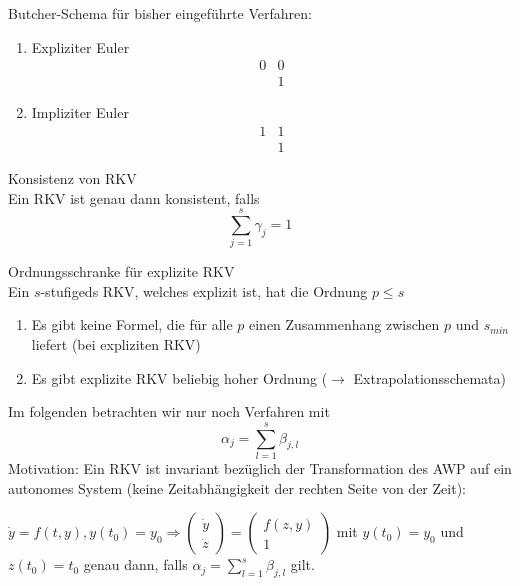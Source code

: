 \begin{example}
	Butcher-Schema für bisher eingeführte Verfahren:
	
	\begin{enumerate}
		\item Expliziter Euler
				$$\begin{array}{cc}
			0 & 0\\
			  & 1
		\end{array}$$

		\item Impliziter Euler
				$$\begin{array}{cc}
			1 & 1\\
			  & 1
		\end{array}$$
		
	\end{enumerate}
\end{example}

\begin{theorem}
	Konsistenz von RKV
	\\
	Ein RKV ist genau dann konsistent, falls
	$$\sum_{j=1}^{s}\gamma_{j}=1$$
\end{theorem}

\begin{theorem}
	Ordnungsschranke für explizite RKV
	\\
	Ein $s$-stufigeds RKV, welches explizit ist, hat die Ordnung $p\le s$
\end{theorem}

\begin{remark}
	\begin{enumerate}
		\item Es gibt keine Formel, die für alle $p$ einen Zusammenhang zwischen $p$ und $s_{min}$ liefert (bei expliziten RKV)
		\item Es gibt explizite RKV beliebig hoher Ordnung ($\rightarrow$ Extrapolationsschemata)
	\end{enumerate}
\end{remark}

Im folgenden betrachten wir nur noch Verfahren mit $$\alpha_{j}=\sum_{l=1}^{s}\beta_{j,l}$$
Motivation: Ein RKV ist invariant bezüglich der Transformation des AWP auf ein autonomes System (keine Zeitabhängigkeit der rechten
Seite von der Zeit):

$\dot y = f(t,y), y(t_{0})=y_{0}\Rightarrow \left ( \begin{array}{c}
\dot y\\
\dot z
\end{array} \right ) = \left (
\begin{array}
{c}
	f(z,y)\\
	1
\end{array} \right )$ mit $y(t_{0})=y_{0}$ und $z(t_{0})=t_{0}$
genau dann, falls $\alpha_{j}=\sum_{l=1}^{s}\beta_{j,l}$ gilt.

